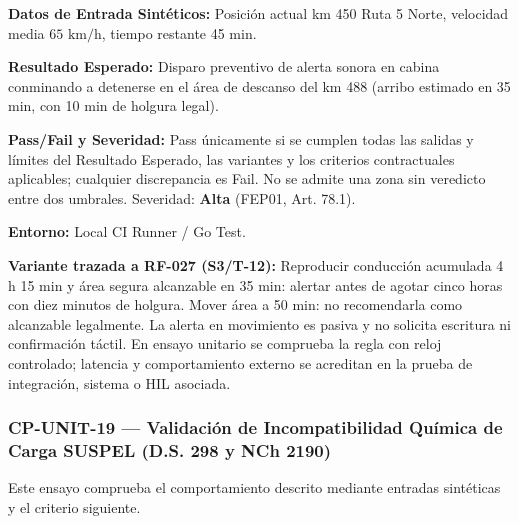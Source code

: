 \par\noindent\textbf{Datos de Entrada Sintéticos:} Posición actual km 450 Ruta 5 Norte, velocidad media \(65\text{ km/h}\), tiempo restante 45 min.\par
\par\noindent\textbf{Resultado Esperado:} Disparo preventivo de alerta sonora en cabina conminando a detenerse en el área de descanso del km 488 (arribo estimado en 35 min, con 10 min de holgura legal).\par
\par\noindent\textbf{Pass/Fail y Severidad:} Pass únicamente si se cumplen todas las salidas y límites del Resultado Esperado, las variantes y los criterios contractuales aplicables; cualquier discrepancia es Fail. No se admite una zona sin veredicto entre dos umbrales. Severidad: \textbf{Alta} (FEP01, Art. 78.1).\par
\par\noindent\textbf{Entorno:} Local CI Runner / Go Test.\par







\par\noindent\textbf{Variante trazada a RF-027 (S3/T-12):} Reproducir conducción acumulada 4 h 15 min y área segura alcanzable en 35 min: alertar antes de agotar cinco horas con diez minutos de holgura. Mover área a 50 min: no recomendarla como alcanzable legalmente. La alerta en movimiento es pasiva y no solicita escritura ni confirmación táctil. En ensayo unitario se comprueba la regla con reloj controlado; latencia y comportamiento externo se acreditan en la prueba de integración, sistema o HIL asociada.\par
\subsubsection*{CP-UNIT-19 — Validación de Incompatibilidad Química de Carga SUSPEL (D.S. 298 y NCh 2190)}\label{sec:9-cp-unit-19}
Este ensayo comprueba el comportamiento descrito mediante entradas sintéticas y el criterio siguiente.

